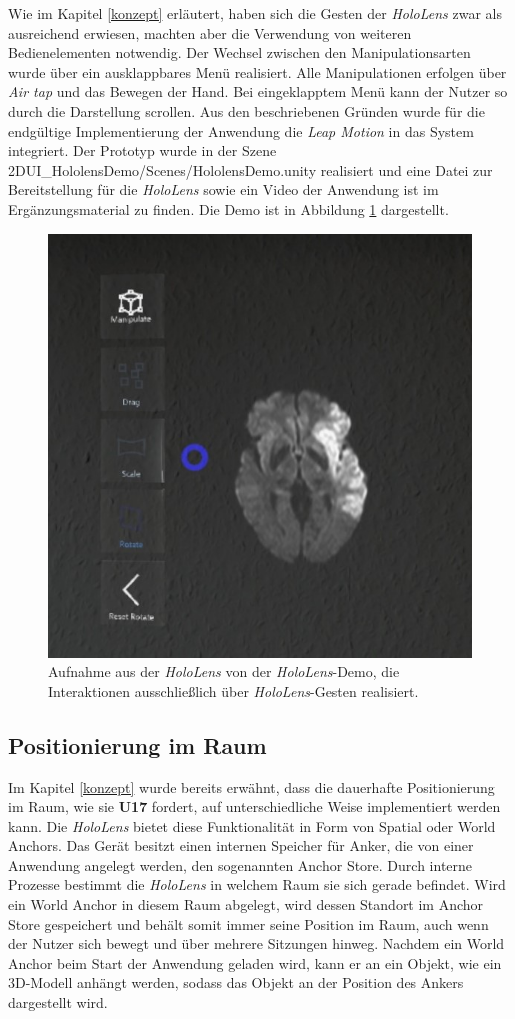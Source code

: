 Wie im Kapitel \ref{konzept} erläutert, haben sich die Gesten der \textit{HoloLens} zwar als ausreichend erwiesen, machten aber die Verwendung von weiteren Bedienelementen notwendig. Der Wechsel zwischen den Manipulationsarten wurde über ein ausklappbares Menü realisiert. Alle Manipulationen erfolgen über \textit{Air tap} und das Bewegen der Hand. Bei eingeklapptem Menü kann der Nutzer so durch die Darstellung scrollen. Aus den beschriebenen Gründen wurde für die endgültige Implementierung der Anwendung die \textit{Leap Motion} in das System integriert.
Der Prototyp wurde in der Szene 2DUI\_HololensDemo/Scenes/HololensDemo.unity realisiert und eine Datei zur Bereitstellung für die \textit{HoloLens} sowie ein Video der Anwendung ist im Ergänzungsmaterial zu finden.
Die Demo ist in Abbildung \ref{img:prototyp} dargestellt.

\begin{figure}[!htb]
	\centering
	\includegraphics[width=0.5\linewidth]{images/hololens_prototyp.jpg}
	\caption{Aufnahme aus der \textit{HoloLens} von der \textit{HoloLens}-Demo, die Interaktionen ausschließlich über \textit{HoloLens}-Gesten realisiert.}
	\label{img:prototyp}
\end{figure}
\FloatBarrier

\subsection{Positionierung im Raum}
\label{anchor}

Im Kapitel \ref{konzept} wurde bereits erwähnt, dass die dauerhafte Positionierung im Raum, wie sie \textbf{U17} fordert, auf unterschiedliche Weise implementiert werden kann. 
Die \textit{HoloLens} bietet diese Funktionalität in Form von Spatial oder World Anchors. Das Gerät besitzt einen internen Speicher für Anker, die von einer Anwendung angelegt werden, den sogenannten Anchor Store. Durch interne Prozesse bestimmt die \textit{HoloLens} in welchem Raum sie sich gerade befindet. Wird ein World Anchor in diesem Raum abgelegt, wird dessen Standort im Anchor Store gespeichert und behält somit immer seine Position im Raum, auch wenn der Nutzer sich bewegt und über mehrere Sitzungen hinweg. Nachdem ein World Anchor beim Start der Anwendung geladen wird, kann er an ein Objekt, wie ein 3D-Modell anhängt werden, sodass das Objekt an der Position des Ankers dargestellt wird. 

